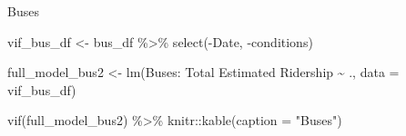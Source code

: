 \documentclass[
  letterpaper,
  DIV=11,
  numbers=noendperiod]{scrartcl}
\newenvironment{Shaded}{\begin{snugshade}}{\end{snugshade}}
\newcommand{\AttributeTok}[1]{\textcolor[rgb]{0.40,0.45,0.13}{#1}}
\newcommand{\FunctionTok}[1]{\textcolor[rgb]{0.28,0.35,0.67}{#1}}
\newcommand{\NormalTok}[1]{\textcolor[rgb]{0.00,0.23,0.31}{#1}}
\newcommand{\OtherTok}[1]{\textcolor[rgb]{0.00,0.23,0.31}{#1}}
\newcommand{\SpecialCharTok}[1]{\textcolor[rgb]{0.37,0.37,0.37}{#1}}
\newcommand{\StringTok}[1]{\textcolor[rgb]{0.13,0.47,0.30}{#1}}
\begin{document}
Buses

\begin{Shaded}
\begin{Highlighting}[]
\NormalTok{vif\_bus\_df }\OtherTok{\textless{}{-}}  
\NormalTok{  bus\_df }\SpecialCharTok{\%\textgreater{}\%}
  \FunctionTok{select}\NormalTok{(}\SpecialCharTok{{-}}\NormalTok{Date,}
         \SpecialCharTok{{-}}\NormalTok{conditions)}

\NormalTok{full\_model\_bus2 }\OtherTok{\textless{}{-}} \FunctionTok{lm}\NormalTok{(}\StringTok{\textasciigrave{}}\AttributeTok{Buses: Total Estimated Ridership}\StringTok{\textasciigrave{}} \SpecialCharTok{\textasciitilde{}}\NormalTok{ ., }\AttributeTok{data =}\NormalTok{ vif\_bus\_df)}

\FunctionTok{vif}\NormalTok{(full\_model\_bus2) }\SpecialCharTok{\%\textgreater{}\%}\NormalTok{ knitr}\SpecialCharTok{::}\FunctionTok{kable}\NormalTok{(}\AttributeTok{caption =} \StringTok{"Buses"}\NormalTok{)}
\end{Highlighting}
\end{Shaded}
\end{document}
